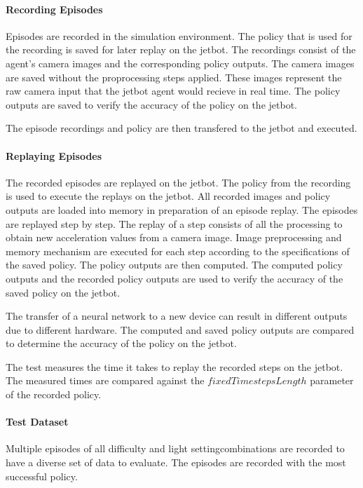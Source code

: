 \paragraph{Recording Episodes}

Episodes are recorded in the simulation environment. The policy that is used for the recording is saved for later replay on the jetbot.
The recordings consist of the agent's camera images and the corresponding policy outputs. The camera images are saved without the proprocessing steps applied. These images represent the raw camera input that the jetbot agent would recieve in real time. The policy outputs are saved to verify the accuracy of the policy on the jetbot.

The episode recordings and policy are then transfered to the jetbot and executed. 

\paragraph{Replaying Episodes}

The recorded episodes are replayed on the jetbot. The policy from the recording is used to execute the replays on the jetbot. All recorded images and policy outputs are loaded into memory in preparation of an episode replay. 
The episodes are replayed step by step. The replay of a step consists of all the processing to obtain new acceleration values from a camera image. Image preprocessing and memory mechanism are executed for each step according to the specifications of the saved policy. The policy outputs are then computed. The computed policy outputs and the recorded policy outputs are used to verify the accuracy of the saved policy on the jetbot. 

The transfer of a neural network to a new device can result in different outputs due to different hardware. The computed and saved policy outputs are compared to determine the accuracy of the policy on the jetbot.

The test measures the time it takes to replay the recorded steps on the jetbot.
The measured times are compared against the $fixedTimestepsLength$ parameter of the recorded policy.


\paragraph{Test Dataset}

Multiple episodes of all difficulty and light settingcombinations are recorded to have a diverse set of data to evaluate. The episodes are recorded with the most successful policy.

